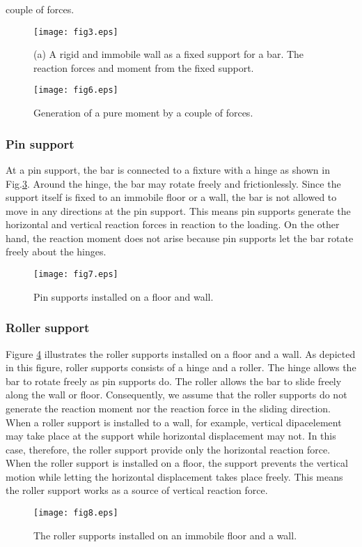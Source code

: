 \documentclass[10pt,a4j]{article}
\begin{document}
couple of forces.
\begin{figure}[h]
	\begin{center}
	\texttt{[image: fig3.eps]} 
	\end{center}
	\caption{(a) A rigid and immobile wall as a fixed support for a bar. 
	The reaction forces and moment  from the fixed support.} 
	\label{fig:fig3}
\end{figure}
\begin{figure}[h]
	\begin{center}
	\texttt{[image: fig6.eps]} 
	\end{center}
	\caption{Generation of a pure moment by a couple of forces.} 
	\label{fig:fig6}
\end{figure}
\subsubsection{Pin support}
At a pin support, the bar is connected to a fixture with a hinge 
as shown in Fig.\ref{fig:fig7}.
Around the hinge, the bar may rotate freely and frictionlessly.
Since the support itself is fixed to an immobile floor or a wall, 
the bar is not allowed to move in any directions at the pin support. 
This means pin supports generate the horizontal and vertical 
reaction forces in reaction to the loading.
On the other hand, the reaction moment does not arise 
because pin supports let the bar rotate freely about the hinges. 
\begin{figure}[h]
	\begin{center}
	\texttt{[image: fig7.eps]} 
	\end{center}
	\caption{Pin supports installed on a floor and wall.} 
	\label{fig:fig7}
\end{figure}
\subsubsection{Roller support}
Figure \ref{fig:fig8} illustrates the roller supports installed on a floor 
and a wall. As depicted in this figure, roller supports consists of 
a hinge and a roller. The hinge allows the bar to rotate freely as pin 
supports do. The roller allows the bar to slide freely along the wall or floor.  
Consequently, we assume that the roller supports do not generate 
the reaction moment nor the reaction force in the sliding direction. 
 When a roller support is installed to a wall, for example, vertical 
 dipacelement may take place at the support while horizontal displacement 
may not. In this case, therefore, the roller support provide only the horizontal 
reaction force. When the roller support is installed on a floor, 
the support prevents the vertical motion while letting the horizontal 
displacement takes place freely. This means the roller support works as a source 
of vertical reaction force.
\begin{figure}[h]
	\begin{center}
	\texttt{[image: fig8.eps]} 
	\end{center}
	\caption{The roller supports installed on an immobile floor and a wall.} 
	\label{fig:fig8}
\end{figure}
\end{document}
